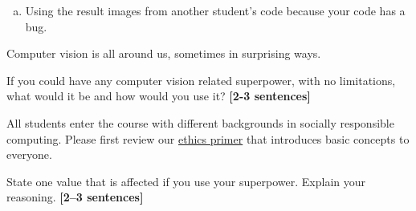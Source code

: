 \documentclass{csci1430}
\begin{document}
\begin{enumerate}[(a)]

\item
Using the result images from another student's code because your code has a bug.


\end{enumerate}

\pagebreak %

\begin{question}[points=8,drawbox=false]
Computer vision is all around us, sometimes in surprising ways.
\end{question}

\begin{subquestion}[points=2]
If you could have any computer vision related superpower, with no limitations, what would it be and how would you use it? \textbf{[2-3 sentences]}
\end{subquestion}

\begin{answer}[height=7]

\end{answer}


\begin{subquestion}[points=6,drawbox=false]
All students enter the course with different backgrounds in socially responsible computing. Please first review our \href{https://browncsci1430.github.io/resources/ethics_primer/}{ethics primer} that introduces basic concepts to everyone.
\end{subquestion}

\begin{subsubquestion}[points=3]
State one value that is affected if you use your superpower. Explain your reasoning. \textbf{[2--3 sentences]}
\end{subsubquestion}
    
\begin{answer}[height=7]

\end{answer}
\end{document}
